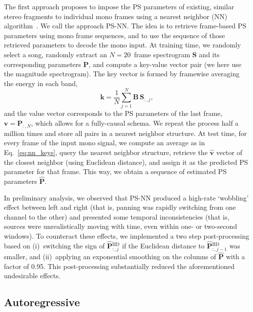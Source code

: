 \documentclass{article}
\newcommand{\ma}[1]{\textbf{#1}}
\newcommand{\ve}[1]{\textbf{#1}}
\begin{document}
The first approach proposes to impose the PS parameters of existing, similar stereo fragments to individual mono frames using a nearest neighbor (NN) algorithm~\cite{Hastie_2009}. We call the approach PS-NN. The idea is to retrieve frame-based PS parameters using mono frame sequences, and to use the sequence of those retrieved parameters to decode the mono input. %
At training time, we randomly select a song, randomly extract an $N=20$~frame spectrogram $\ma{S}$ and its corresponding parameters $\ma{P}$, and compute a key-value vector pair (we here use the magnitude spectrogram). The key vector is formed by framewise averaging the energy in each band,
\begin{equation}
    \ve{k}=\frac{1}{N}\sum_{j=1}^{N}\ma{B}\,\ma{S}_{:,j} ,
    \label{eq:nn_keys}
\end{equation} 
and the value vector corresponds to the PS parameters of the last frame, $\ve{v}=\ma{P}_{:,N}$, which allows for a fully-causal schema. We repeat the process half a million times and store all pairs in a nearest neighbor structure. At test time, for every frame of the input mono signal, we compute an average as in Eq.~\ref{eq:nn_keys}, query the nearest neighbor structure, retrieve the $\hat{\ve{v}}$ vector of the closest neighbor (using Euclidean distance), and assign it as the predicted PS parameter for that frame. This way, we obtain a sequence of estimated PS parameters $\hat{\ma{P}}$.

In preliminary analysis, we observed that PS-NN produced a high-rate `wobbling' effect between left and right (that is, panning was rapidly switching from one channel to the other) and presented some temporal inconsistencies (that is, sources were unrealistically moving with time, even within one- or two-second windows). To counteract these effects, we implemented a two step post-processing based on (i)~switching the sign of $\hat{\ma{P}}{}^{\text{IID}}_{:,j}$ if the Euclidean distance to $\hat{\ma{P}}{}^{\text{IID}}_{:,j-1}$ was smaller, and (ii)~applying an exponential smoothing on the columns of $\hat{\ma{P}}$ with a factor of 0.95. This post-processing substantially reduced the aforementioned undesirable effects.

\subsection{Autoregressive}
\label{sec:ar}
\end{document}

